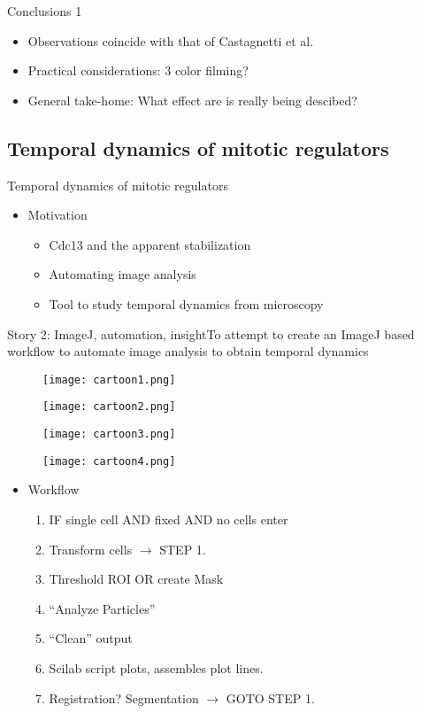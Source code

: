 \begin{frame}{Conclusions 1}
\begin{itemize}
\item Observations coincide with that of Castagnetti et al.
\item Practical considerations: 3 color filming?
\item General take-home: What effect are is really being descibed?
\end{itemize}
\end{frame}
\subsection{Temporal dynamics of mitotic regulators}
\begin{frame}{Temporal dynamics of mitotic regulators}
\begin{itemize}	
	\item Motivation
		\begin{itemize}	
			\item Cdc13 and the apparent stabilization
			\item Automating image analysis
			\item Tool to study temporal dynamics from microscopy
		\end{itemize}
		
\end{itemize}
\end{frame}
\begin{frame}[allowframebreaks]{Story 2: ImageJ, automation, insight}{To attempt to create an ImageJ based workflow to automate image analysis to obtain temporal dynamics}
\begin{figure}
\texttt{[image: cartoon1.png]}
\end{figure}
\framebreak
\begin{figure}
\texttt{[image: cartoon2.png]}
\end{figure}
\framebreak
\begin{figure}
\texttt{[image: cartoon3.png]}
\end{figure}
\framebreak
\begin{figure}
\texttt{[image: cartoon4.png]}
\end{figure}


\framebreak
\begin{itemize}
	\item Workflow
		\begin{enumerate}
		\item IF single cell AND fixed AND no cells enter 
		\item Transform cells $\rightarrow$ STEP 1.
		\item Threshold ROI OR create Mask
		\item ``Analyze Particles''
		\item ``Clean'' output 
		\item Scilab script plots, assembles plot lines.
		\item Registration? Segmentation $\rightarrow$ GOTO STEP 1.
		\end{enumerate}

\end{itemize}
\end{frame}

